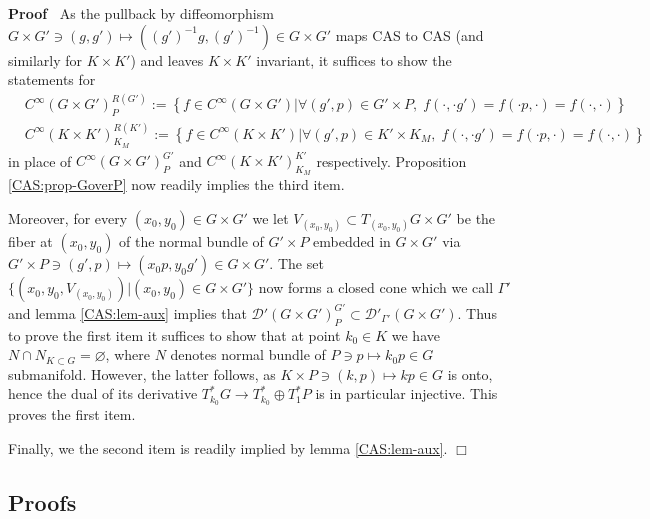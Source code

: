 \documentclass{article}
\newcommand{\assign}{:=}
\newenvironment{proof}{\noindent\textbf{Proof\ }}{\hspace*{\fill}$\Box$\medskip}
\begin{document}
\begin{proof}
  As the pullback by diffeomorphism $G \times G' \ni (g, g') \mapsto ((g')^{-
  1} g, (g')^{- 1}) \in G \times G'$ maps CAS to CAS (and similarly for $K
  \times K'$) and leaves $K \times K'$ invariant, it suffices to show the
  statements for
  \begin{eqnarray}
    & C^{\infty} (G \times G')^{R (G')}_P \assign \left\{ f \in C^{\infty} (G
    \times G') \big| \forall (g', p) \in G' \times P, \; f (\cdot, \cdot
    g') = f (\cdot p, \cdot) = f (\cdot, \cdot) \right\} &  \nonumber\\
    & C^{\infty} (K \times K')_{K_M}^{R (K')} \assign \left\{ f \in
    C^{\infty} (K \times K') \big| \forall (g', p) \in K' \times K_M, \; f
    (\cdot, \cdot g') = f (\cdot p, \cdot) = f (\cdot, \cdot) \right\} & 
    \nonumber
  \end{eqnarray}
  in place of $C^{\infty} (G \times G')^{G'}_P$ and $C^{\infty} (K \times
  K')_{K_M}^{K'}$ respectively. Proposition \ref{CAS:prop-GoverP} now readily
  implies the third item.
  
  Moreover, for every $(x_0, y_0) \in G \times G'$ we let $V_{(x_0, y_0)}
  \subset T_{(x_0, y_0)} G \times G'$ be the fiber at $(x_0, y_0)$ of the
  normal bundle of $G' \times P$ embedded in $G \times G'$ via $G' \times P
  \ni (g', p) \mapsto (x_0 p, y_0 g') \in G \times G'$. The set $\{ (x_0, y_0,
  V_{(x_0, y_0)}) | (x_0, y_0) \in G \times G' \}$ now forms a closed cone
  which we call $\Gamma'$ and lemma \ref{CAS:lem-aux} implies that
  $\mathcal{D}' (G \times G')_P^{G'} \subset \mathcal{D}'_{\Gamma'} (G \times
  G')$. Thus to prove the first item it suffices to show that at point $k_0
  \in K$ we have $N \cap N_{K \subset G} = \varnothing$, where $N$ denotes
  normal bundle of $P \ni p \mapsto k_0 p \in G$ submanifold. However, the
  latter follows, as $K \times P \ni (k, p) \mapsto k p \in G$ is onto, hence
  the dual of its derivative $T_{k_0}^{\ast} G \rightarrow T_{k_0}^{\ast}
  \oplus T_1^{\ast} P$ is in particular injective. This proves the first item.
  
  Finally, we the second item is readily implied by lemma \ref{CAS:lem-aux}.
\end{proof}

\subsection{Proofs}
\end{document}
